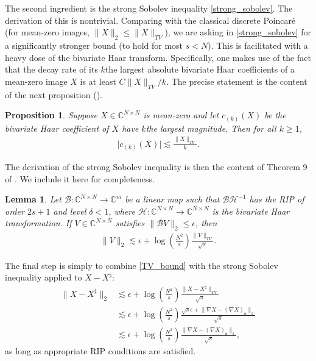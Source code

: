 \documentclass[11pt, oneside]{article}   %
\newtheorem{proposition}[theorem]{Proposition}
\newtheorem{lemma}[theorem]{Lemma}
\newcommand{\bC}{\mathbb{C}}
\newcommand{\B}{\mathcal{B}}
\renewcommand{\H}{\mathcal{H}}
\newcommand{\norm}[1]{\lVert #1 \rVert}
\newcommand{\abs}[1]{\lvert#1 \rvert}
\begin{document}
The second ingredient is the strong Sobolev inequality \eqref{strong_sobolev}. The derivation of this  is nontrivial. Comparing with the classical discrete Poincar\'{e} (for mean-zero images, $\norm{X}_2 \leq \norm{X}_{TV}$), we are asking in \eqref{strong_sobolev} for a significantly 
stronger bound (to hold for most $s < N$). This is facilitated with a heavy 
dose of the bivariate Haar transform. Specifically, one makes use of the fact 
that the decay rate of its $k$the largest absolute bivariate Haar coefficients 
of a mean-zero image $X$ is at least $C\norm{X}_{TV}/k$. The precise statement is the content of the next proposition (\!\!\cite[Proposition 8]{needell2013stable}). 

\begin{proposition}
        Suppose $X \in \bC^{N\times N}$ is mean-zero and let $c_{(k)}(X)$ be the bivariate Haar coefficient of $X$ have $k$the largest magnitude. Then for all $k\geq 1$, 
\begin{align*}
        \abs{c_{(k)}(X)} \lesssim \frac{\norm{X}_{TV}}{k}.
\end{align*}
\end{proposition}
 
The derivation of the strong Sobolev inequality is then the content of Theorem 9 of \cite{needell2013stable}. We include it here for completeness.

\begin{lemma}
        Let $\B: \bC^{N\times N} \to \bC^m$ be a linear map such that $\B \H^{-1}$ has the RIP of order $2s+1$ and level $\delta < 1$, where $\H: \bC^{N\times N} \to \bC^{N\times N}$ is the bivariate Haar transformation. If $V \in \bC^{N\times N}$ satisfies $\norm{\B V}_2 \leq \epsilon$, then 
\begin{align*}
        \norm{V}_2 \lesssim \epsilon + \log\left(\frac{N^2}{s}\right) \frac{\norm{V}_{TV}}{\sqrt{s}}.
\end{align*}
\end{lemma}

The final step is simply to combine \eqref{TV_bound} with the strong Sobolev inequality applied to $X - X^\sharp$:
\begin{align*}
        \norm{X - X^\sharp}_2 
&\lesssim \epsilon + \log\left(\frac{N^2}{s}\right) \frac{\norm{ X- X^\sharp}_{TV}}{\sqrt{s}} \\
&\lesssim \epsilon + \log\left(\frac{N^2}{s}\right) \frac{\sqrt{s}\epsilon + \norm{\nabla X - (\nabla X)_\mathbf{s}}_1}{\sqrt{s}} \\ 
&\lesssim \epsilon + \log\left(\frac{N^2}{s}\right) \frac{\norm{\nabla X - (\nabla X)_\mathbf{s}}_1}{\sqrt{s}},
\end{align*}
as long as appropriate RIP conditions are satisfied.
\end{document}
